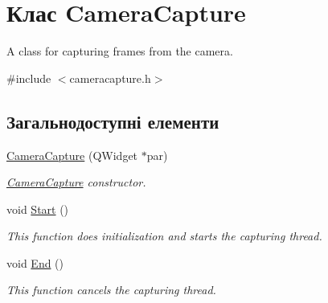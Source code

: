 \hypertarget{classCameraCapture}{\section{Клас Camera\-Capture}
\label{classCameraCapture}
}


A class for capturing frames from the camera.  




{\ttfamily \#include $<$cameracapture.\-h$>$}

\subsection*{Загальнодоступні елементи}
\begin{DoxyCompactItemize}
\item 
\hyperlink{classCameraCapture_a110d7f3ede7cb2e2b24584a9700abd2f}{Camera\-Capture} (Q\-Widget $\ast$par)
\begin{DoxyCompactList}\small\item\em \hyperlink{classCameraCapture}{Camera\-Capture} constructor. \end{DoxyCompactList}\item 
\hypertarget{classCameraCapture_a1ab7b68c620d79769afb3920320250fe}{void \hyperlink{classCameraCapture_a1ab7b68c620d79769afb3920320250fe}{Start} ()}\label{classCameraCapture_a1ab7b68c620d79769afb3920320250fe}

\begin{DoxyCompactList}\small\item\em This function does initialization and starts the capturing thread. \end{DoxyCompactList}\item 
\hypertarget{classCameraCapture_ab29bec18aca2752893b0dcd6b1870cc9}{void \hyperlink{classCameraCapture_ab29bec18aca2752893b0dcd6b1870cc9}{End} ()}\label{classCameraCapture_ab29bec18aca2752893b0dcd6b1870cc9}

\begin{DoxyCompactList}\small\item\em This function cancels the capturing thread. \end{DoxyCompactList}\end{DoxyCompactItemize}
